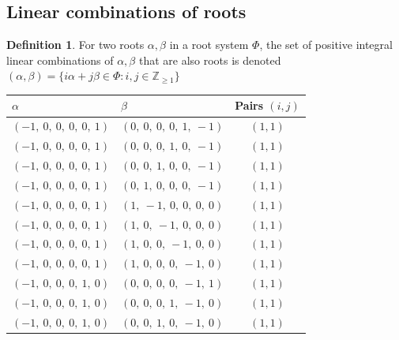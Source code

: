 \documentclass[11pt]{article}
\theoremstyle{definition}
\newtheorem{definition}{Definition}[section]
\begin{document}
\subsection{Linear combinations of roots}

\begin{definition}
For two roots $\alpha, \beta$ in a root system $\Phi$, the set of positive integral linear combinations of $\alpha, \beta$ that are also roots is denoted
\(
	(\alpha, \beta) = \{ i \alpha + j \beta \in \Phi : i, j \in \mathbb{Z}_{\ge 1} \}
\)
\end{definition}

\begin{center}
\begin{tabular}{|l|l|c|}
    \hline
    $\alpha$ & $\beta$ & Pairs $(i,j)$ \\
    \hline
    $\left( -1, \  0, \  0, \  0, \  0, \  1\right)$ & $\left( 0, \  0, \  0, \  0, \  1, \  -1\right)$ & $(1,1)$ \\
    \hline
    $\left( -1, \  0, \  0, \  0, \  0, \  1\right)$ & $\left( 0, \  0, \  0, \  1, \  0, \  -1\right)$ & $(1,1)$ \\
    \hline
    $\left( -1, \  0, \  0, \  0, \  0, \  1\right)$ & $\left( 0, \  0, \  1, \  0, \  0, \  -1\right)$ & $(1,1)$ \\
    \hline
    $\left( -1, \  0, \  0, \  0, \  0, \  1\right)$ & $\left( 0, \  1, \  0, \  0, \  0, \  -1\right)$ & $(1,1)$ \\
    \hline
    $\left( -1, \  0, \  0, \  0, \  0, \  1\right)$ & $\left( 1, \  -1, \  0, \  0, \  0, \  0\right)$ & $(1,1)$ \\
    \hline
    $\left( -1, \  0, \  0, \  0, \  0, \  1\right)$ & $\left( 1, \  0, \  -1, \  0, \  0, \  0\right)$ & $(1,1)$ \\
    \hline
    $\left( -1, \  0, \  0, \  0, \  0, \  1\right)$ & $\left( 1, \  0, \  0, \  -1, \  0, \  0\right)$ & $(1,1)$ \\
    \hline
    $\left( -1, \  0, \  0, \  0, \  0, \  1\right)$ & $\left( 1, \  0, \  0, \  0, \  -1, \  0\right)$ & $(1,1)$ \\
    \hline
    $\left( -1, \  0, \  0, \  0, \  1, \  0\right)$ & $\left( 0, \  0, \  0, \  0, \  -1, \  1\right)$ & $(1,1)$ \\
    \hline
    $\left( -1, \  0, \  0, \  0, \  1, \  0\right)$ & $\left( 0, \  0, \  0, \  1, \  -1, \  0\right)$ & $(1,1)$ \\
    \hline
    $\left( -1, \  0, \  0, \  0, \  1, \  0\right)$ & $\left( 0, \  0, \  1, \  0, \  -1, \  0\right)$ & $(1,1)$ \\

\end{tabular}
\end{center}
\end{document}
